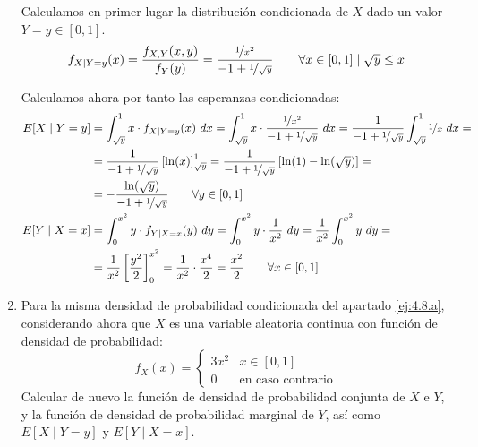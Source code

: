 \begin{ejercicio}
\begin{enumerate}
        Calculamos en primer lugar la distribución condicionada de $X$ dado un valor $Y = y\in [0,1]$.
        \begin{equation*}
            f_{X\mid Y=y}(x) = \dfrac{f_{X,Y}(x,y)}{f_Y(y)}
            = \dfrac{\nicefrac{1}{x^2}}{-1 + \nicefrac{1}{\sqrt{y}}}
            \qquad \forall x\in[0,1] \mid \sqrt{y}\leq x
        \end{equation*}

        Calculamos ahora por tanto las esperanzas condicionadas:
        \begin{align*}
            E[X\mid Y = y] &= \int_{\sqrt{y}}^{1} x\cdot f_{X\mid Y=y}(x) \ dx
            = \int_{\sqrt{y}}^{1} x\cdot \dfrac{\nicefrac{1}{x^2}}{-1 + \nicefrac{1}{\sqrt{y}}} \ dx
            = \dfrac{1}{-1 + \nicefrac{1}{\sqrt{y}}}\int_{\sqrt{y}}^{1} \nicefrac{1}{x} \ dx
            =\\&= \dfrac{1}{-1 + \nicefrac{1}{\sqrt{y}}}\left[\ln(x)\right]_{\sqrt{y}}^{1}
            = \dfrac{1}{-1 + \nicefrac{1}{\sqrt{y}}}\left[\ln(1) - \ln(\sqrt{y})\right]
            =\\&= -\dfrac{\ln(\sqrt{y})}{-1 + \nicefrac{1}{\sqrt{y}}} \qquad\forall y\in[0,1]\\
            E[Y\mid X = x] &= \int_{0}^{x^2} y\cdot f_{Y\mid X=x}(y) \ dy
            = \int_{0}^{x^2} y\cdot \frac{1}{x^2} \ dy
            = \frac{1}{x^2}\int_{0}^{x^2} y \ dy
            =\\&= \frac{1}{x^2}\left[\frac{y^2}{2}\right]_{0}^{x^2}
            = \frac{1}{x^2}\cdot \frac{x^4}{2}
            = \frac{x^2}{2} \qquad \forall x\in[0,1]
        \end{align*}

        
        \item Para la misma densidad de probabilidad condicionada del apartado \ref{ej:4.8.a}, considerando ahora que $X$ es una variable aleatoria continua con función de densidad de probabilidad:
        \begin{equation*}
            f_X(x) = \begin{cases}
                3x^2 & x \in \left[0,1\right]\\
                0 & \text{en caso contrario}
            \end{cases}
        \end{equation*}
        Calcular de nuevo la función de densidad de probabilidad conjunta de $X$ e $Y$, y la función de densidad de probabilidad marginal de $Y$, así como $E[X\mid Y = y]$ y $E[Y\mid X = x]$.\\


\end{enumerate}
\end{ejercicio}
